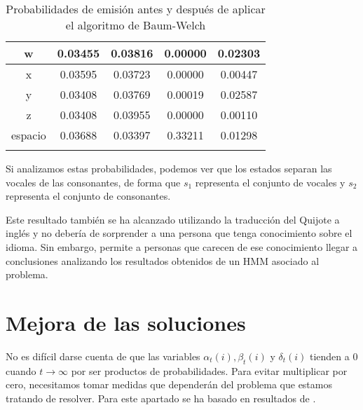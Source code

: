 \begin{exampleth}
\begin{longtable}{|c|C|C|C|C|}
        \hline
        w & 0.03455 & 0.03816 & 0.00000 & 0.02303\\
        \hline
        x & 0.03595 & 0.03723 & 0.00000 & 0.00447\\
        \hline
        y & 0.03408 & 0.03769 & 0.00019 & 0.02587\\
        \hline
        z & 0.03408 & 0.03955 & 0.00000 & 0.00110\\
        \hline
        espacio &  0.03688 & 0.03397 & 0.33211 &  0.01298\\
        \hline
        \caption{Probabilidades de emisión antes y después de aplicar el algoritmo de Baum-Welch \cite{Stamp}}
\end{longtable}
Si analizamos estas probabilidades, podemos ver que los estados separan las vocales de las consonantes, de forma que $s_1$ representa el conjunto de vocales y $s_2$ representa el conjunto de consonantes.

Este resultado también se ha alcanzado utilizando la traducción del Quijote a inglés \cite{AnalisisVoynich} y no debería de sorprender a una persona que tenga conocimiento sobre el idioma. Sin embargo, permite a personas que carecen de ese conocimiento llegar a conclusiones analizando los resultados obtenidos de un HMM asociado al problema.
\end{exampleth}

\section{Mejora de las soluciones}
No es difícil darse cuenta de que las variables $\alpha_t(i), \beta_t(i)$ y $\delta_t(i)$ tienden a $0$ cuando $t\rightarrow\infty$ por ser productos de probabilidades. Para evitar multiplicar por cero, necesitamos tomar medidas que dependerán del problema que estamos tratando de resolver. Para este apartado se ha basado en resultados de \cite{Stamp}.
